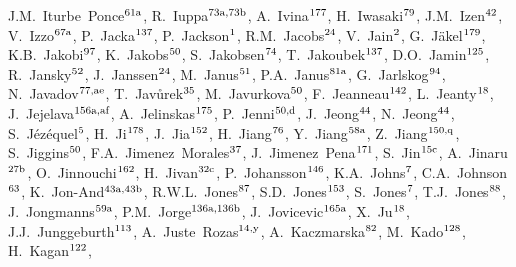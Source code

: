 \begin{flushleft}
J.M.~Iturbe~Ponce$^\textrm{\scriptsize 61a}$,    
R.~Iuppa$^\textrm{\scriptsize 73a,73b}$,    
A.~Ivina$^\textrm{\scriptsize 177}$,    
H.~Iwasaki$^\textrm{\scriptsize 79}$,    
J.M.~Izen$^\textrm{\scriptsize 42}$,    
V.~Izzo$^\textrm{\scriptsize 67a}$,    
P.~Jacka$^\textrm{\scriptsize 137}$,    
P.~Jackson$^\textrm{\scriptsize 1}$,    
R.M.~Jacobs$^\textrm{\scriptsize 24}$,    
V.~Jain$^\textrm{\scriptsize 2}$,    
G.~J\"akel$^\textrm{\scriptsize 179}$,    
K.B.~Jakobi$^\textrm{\scriptsize 97}$,    
K.~Jakobs$^\textrm{\scriptsize 50}$,    
S.~Jakobsen$^\textrm{\scriptsize 74}$,    
T.~Jakoubek$^\textrm{\scriptsize 137}$,    
D.O.~Jamin$^\textrm{\scriptsize 125}$,    
R.~Jansky$^\textrm{\scriptsize 52}$,    
J.~Janssen$^\textrm{\scriptsize 24}$,    
M.~Janus$^\textrm{\scriptsize 51}$,    
P.A.~Janus$^\textrm{\scriptsize 81a}$,    
G.~Jarlskog$^\textrm{\scriptsize 94}$,    
N.~Javadov$^\textrm{\scriptsize 77,ae}$,    
T.~Jav\r{u}rek$^\textrm{\scriptsize 35}$,    
M.~Javurkova$^\textrm{\scriptsize 50}$,    
F.~Jeanneau$^\textrm{\scriptsize 142}$,    
L.~Jeanty$^\textrm{\scriptsize 18}$,    
J.~Jejelava$^\textrm{\scriptsize 156a,af}$,    
A.~Jelinskas$^\textrm{\scriptsize 175}$,    
P.~Jenni$^\textrm{\scriptsize 50,d}$,    
J.~Jeong$^\textrm{\scriptsize 44}$,    
N.~Jeong$^\textrm{\scriptsize 44}$,    
S.~J\'ez\'equel$^\textrm{\scriptsize 5}$,    
H.~Ji$^\textrm{\scriptsize 178}$,    
J.~Jia$^\textrm{\scriptsize 152}$,    
H.~Jiang$^\textrm{\scriptsize 76}$,    
Y.~Jiang$^\textrm{\scriptsize 58a}$,    
Z.~Jiang$^\textrm{\scriptsize 150,q}$,    
S.~Jiggins$^\textrm{\scriptsize 50}$,    
F.A.~Jimenez~Morales$^\textrm{\scriptsize 37}$,    
J.~Jimenez~Pena$^\textrm{\scriptsize 171}$,    
S.~Jin$^\textrm{\scriptsize 15c}$,    
A.~Jinaru$^\textrm{\scriptsize 27b}$,    
O.~Jinnouchi$^\textrm{\scriptsize 162}$,    
H.~Jivan$^\textrm{\scriptsize 32c}$,    
P.~Johansson$^\textrm{\scriptsize 146}$,    
K.A.~Johns$^\textrm{\scriptsize 7}$,    
C.A.~Johnson$^\textrm{\scriptsize 63}$,    
K.~Jon-And$^\textrm{\scriptsize 43a,43b}$,    
R.W.L.~Jones$^\textrm{\scriptsize 87}$,    
S.D.~Jones$^\textrm{\scriptsize 153}$,    
S.~Jones$^\textrm{\scriptsize 7}$,    
T.J.~Jones$^\textrm{\scriptsize 88}$,    
J.~Jongmanns$^\textrm{\scriptsize 59a}$,    
P.M.~Jorge$^\textrm{\scriptsize 136a,136b}$,    
J.~Jovicevic$^\textrm{\scriptsize 165a}$,    
X.~Ju$^\textrm{\scriptsize 18}$,    
J.J.~Junggeburth$^\textrm{\scriptsize 113}$,    
A.~Juste~Rozas$^\textrm{\scriptsize 14,y}$,    
A.~Kaczmarska$^\textrm{\scriptsize 82}$,    
M.~Kado$^\textrm{\scriptsize 128}$,    
H.~Kagan$^\textrm{\scriptsize 122}$,    

\end{flushleft}
